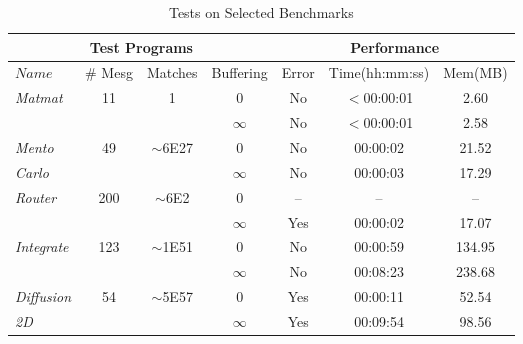 
\begin{table*}[t]
\begin{center}
\scriptsize
\caption{Tests on Selected Benchmarks}\label{table:benchmarks}
\begin{tabular}{|l|c|c|c|c|c|c|}
		\hline
         \multicolumn{4}{|c|}{Test Programs} & \multicolumn{3}{|c|}{Performance} \\ \hline
          $Name$&\# Mesg&Matches&Buffering&Error&Time(hh:mm:ss)&Mem(MB) \\ \hline
           \textit{Matmat} & 11 & 1 & 0 & No & $<$00:00:01 & 2.60\\
          	      & & & $\infty$ & No & $<$00:00:01 & 2.58\\ \hline
	 \textit{Mento} & 49 & $\sim$6E27 & 0 & No & 00:00:02 & 21.52\\
          \textit{Carlo}  & & & $\infty$ & No & 00:00:03 & 17.29 \\ \hline
	 \textit{Router}   & 200 & $\sim$6E2 & 0 & -- & -- & --\\
          	      & & & $\infty$ & Yes & 00:00:02 & 17.07 \\ \hline
	 \textit{Integrate}  & 123 & $\sim$1E51 & 0 & No & 00:00:59 & 134.95 \\
          	      & & &  $\infty$ & No & 00:08:23 & 238.68\\ \hline
	  \textit{Diffusion}  & 54 & $\sim$5E57 & 0 & Yes & 00:00:11 & 52.54 \\
           \textit{2D} &  & & $\infty$ & Yes & 00:09:54 & 98.56\\ \hline          
          		\end{tabular}
\end{center}
\end{table*}

